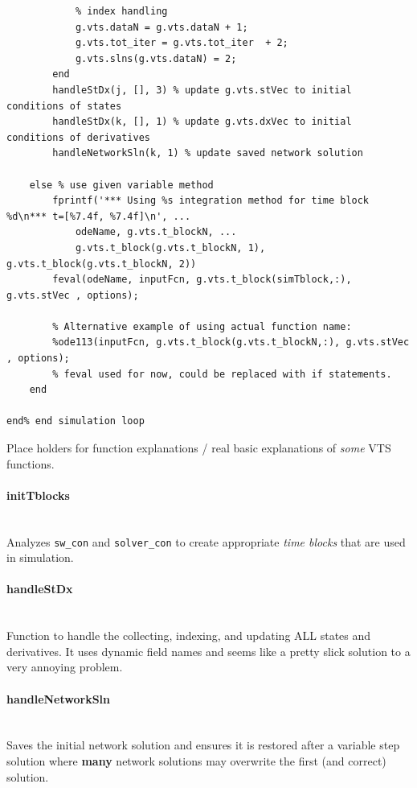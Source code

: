 \documentclass[12pt]{article}
\begin{document}
\begin{verbatim}
            % index handling
            g.vts.dataN = g.vts.dataN + 1;
            g.vts.tot_iter = g.vts.tot_iter  + 2;
            g.vts.slns(g.vts.dataN) = 2;
        end
        handleStDx(j, [], 3) % update g.vts.stVec to initial conditions of states
        handleStDx(k, [], 1) % update g.vts.dxVec to initial conditions of derivatives 
        handleNetworkSln(k, 1) % update saved network solution

    else % use given variable method
        fprintf('*** Using %s integration method for time block %d\n*** t=[%7.4f, %7.4f]\n', ...
            odeName, g.vts.t_blockN, ...
            g.vts.t_block(g.vts.t_blockN, 1), g.vts.t_block(g.vts.t_blockN, 2))
        feval(odeName, inputFcn, g.vts.t_block(simTblock,:), g.vts.stVec , options);
        
        % Alternative example of using actual function name:
        %ode113(inputFcn, g.vts.t_block(g.vts.t_blockN,:), g.vts.stVec , options);
        % feval used for now, could be replaced with if statements.
    end
    
end% end simulation loop
\end{verbatim}

\pagebreak

Place holders for function explanations / real basic explanations of \emph{some} VTS functions.

\paragraph{initTblocks} \ \\
Analyzes \verb|sw_con| and \verb|solver_con| to create appropriate \emph{time blocks} that are used in simulation.

\paragraph{handleStDx} \ \\
Function to handle the collecting, indexing, and updating ALL states and derivatives.
It uses dynamic field names and seems like a pretty slick solution to a very annoying problem.

\paragraph{handleNetworkSln} \ \\
Saves the initial network solution and ensures it is restored after a variable step solution where \textbf{many} network solutions may overwrite the first (and correct) solution.
\end{document}
